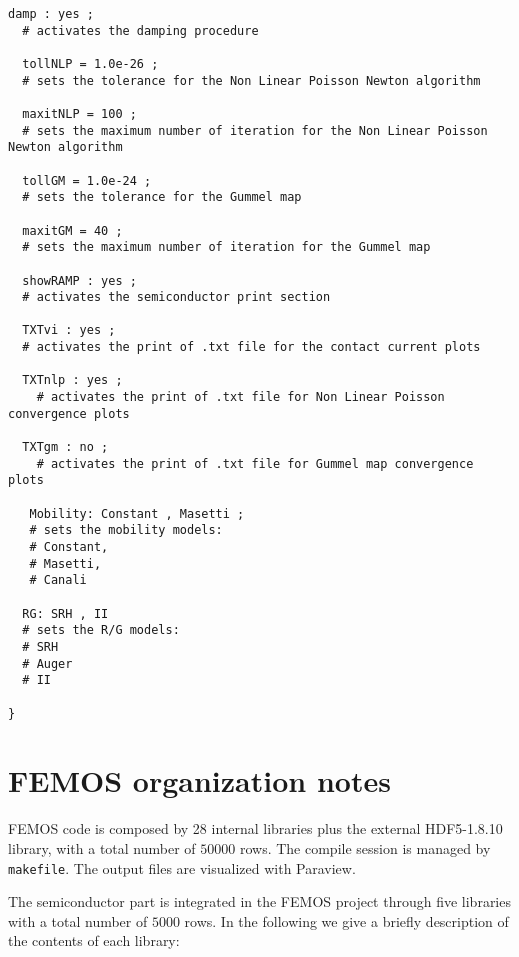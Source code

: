 \begin{lstlisting}[style = general]
  damp : yes ; 
  # activates the damping procedure
  
  tollNLP = 1.0e-26 ;
  # sets the tolerance for the Non Linear Poisson Newton algorithm
   
  maxitNLP = 100 ; 
  # sets the maximum number of iteration for the Non Linear Poisson Newton algorithm

  tollGM = 1.0e-24 ;   
  # sets the tolerance for the Gummel map
  
  maxitGM = 40 ; 
  # sets the maximum number of iteration for the Gummel map

  showRAMP : yes ; 
  # activates the semiconductor print section

  TXTvi : yes ; 
  # activates the print of .txt file for the contact current plots

  TXTnlp : yes ;
    # activates the print of .txt file for Non Linear Poisson convergence plots

  TXTgm : no ;
    # activates the print of .txt file for Gummel map convergence plots
  
   Mobility: Constant , Masetti ;
   # sets the mobility models:
   # Constant,
   # Masetti, 
   # Canali
   
  RG: SRH , II
  # sets the R/G models:
  # SRH
  # Auger
  # II
  
}
\end{lstlisting}




\chapter{FEMOS organization notes}

FEMOS code is composed by 28 internal libraries plus the external HDF5-1.8.10 library, with a total number of $50000$ rows. The compile session is managed by \texttt{makefile}. The output files are visualized with Paraview. 

The semiconductor part is integrated in the FEMOS project through five libraries with a total number of $5000$ rows. In the following we give a briefly description of the contents of each library:

